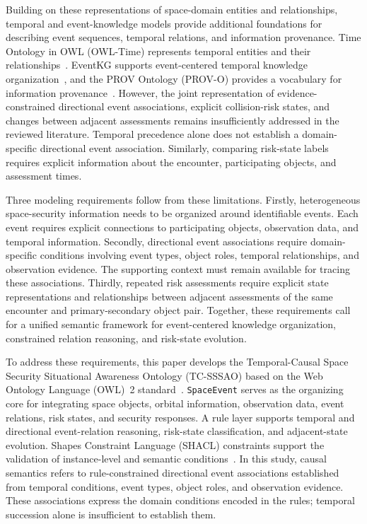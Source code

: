 \documentclass[Royal,sageh,times]{sagej}
\newcommand{\ont}[1]{{\urlstyle{tt}\nolinkurl{#1}}}
\begin{document}
Building on these representations of space-domain entities and relationships, temporal and event-knowledge models provide additional foundations for describing event sequences, temporal relations, and information provenance. Time Ontology in OWL (OWL-Time) represents temporal entities and their relationships~\citep{cox2017owltime}. EventKG supports event-centered temporal knowledge organization~\citep{gottschalk2018eventkg}, and the PROV Ontology (PROV-O) provides a vocabulary for information provenance~\citep{lebo2013provo}. However, the joint representation of evidence-constrained directional event associations, explicit collision-risk states, and changes between adjacent assessments remains insufficiently addressed in the reviewed literature. Temporal precedence alone does not establish a domain-specific directional event association. Similarly, comparing risk-state labels requires explicit information about the encounter, participating objects, and assessment times.

Three modeling requirements follow from these limitations. Firstly, heterogeneous space-security information needs to be organized around identifiable events. Each event requires explicit connections to participating objects, observation data, and temporal information. Secondly, directional event associations require domain-specific conditions involving event types, object roles, temporal relationships, and observation evidence. The supporting context must remain available for tracing these associations. Thirdly, repeated risk assessments require explicit state representations and relationships between adjacent assessments of the same encounter and primary-secondary object pair. Together, these requirements call for a unified semantic framework for event-centered knowledge organization, constrained relation reasoning, and risk-state evolution.

To address these requirements, this paper develops the Temporal-Causal Space Security Situational Awareness Ontology (TC-SSSAO) based on the Web Ontology Language (OWL)~2 standard~\citep{owl2}. \ont{SpaceEvent} serves as the organizing core for integrating space objects, orbital information, observation data, event relations, risk states, and security responses. A rule layer supports temporal and directional event-relation reasoning, risk-state classification, and adjacent-state evolution. Shapes Constraint Language (SHACL) constraints support the validation of instance-level and semantic conditions~\citep{shacl2017}. In this study, causal semantics refers to rule-constrained directional event associations established from temporal conditions, event types, object roles, and observation evidence. These associations express the domain conditions encoded in the rules; temporal succession alone is insufficient to establish them.
\end{document}

